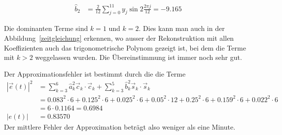\begin{loesung}
\begin{teilaufgaben}
\begin{align*}
\hat b_2
&=
\frac{2}{12}
\sum_{j=0}^{11}
y_j \sin 2\frac{2\pi j}{12}
=
-9.165
\end{align*}
\item
Die dominanten Terme sind $k=1$ und $k=2$.
Dies kann man auch in der Abbildung~\ref{zeitgleichung} erkennen, wo
ausser der Rekonstruktion mit allen Koeffizienten auch das
trigonometrische Polynom gezeigt ist, bei dem die Terme mit $k>2$ weggelassen
wurden.
Die Übereinstimmung ist immer noch sehr gut.
\item
Der Approximationsfehler ist bestimmt durch die die Terme 
\begin{align*}
|\vec{e}(t)|^2
&=
\sum_{k=3}^6 \hat a_k^2 \vec{c}_k\cdot\vec{c}_k
+
\sum_{k=3}^5 \hat b_k^2 \vec{s}_k\cdot\vec{s}_k
\\
&=
0.083^2\cdot 6
+0.125^2\cdot 6
+0.025^2\cdot 6
+0.05^2\cdot 12
+0.25^2\cdot 6
+0.159^2\cdot 6
+0.022^2\cdot 6
\\
&=
6\cdot 0.1164
=
0.6984
\\
|e(t)|
&=
0.83570
\end{align*}
Der mittlere Fehler der Approximation beträgt also weniger als eine Minute.
\qedhere
\end{teilaufgaben}
\end{loesung}

